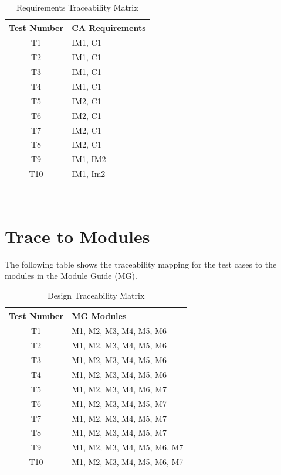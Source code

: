 \documentclass[12pt, titlepage]{article}
\begin{document}
\begin{table} [H]
  \caption{Requirements Traceability Matrix} 
\begin{tabular}{|c|p{4cm}|}
  \hline	
  \textbf{Test Number} & \textbf{CA Requirements}\\
  \hline 
   T1& IM1, C1\\ \hline
   T2& IM1, C1\\ \hline
   T3& IM1, C1\\ \hline
   T4& IM1, C1\\ \hline
   T5& IM2, C1\\ \hline
   T6& IM2, C1\\ \hline
   T7& IM2, C1\\ \hline
   T8& IM2, C1\\ \hline
   T9& IM1, IM2\\ \hline
   T10& IM1, Im2\\ \hline
   

\end{tabular}\\
\end{table}
		
\section{Trace to Modules}\label{sec_tracemodules}
The following table shows the traceability mapping for the test cases  to the
modules in the Module Guide (MG).

\begin{table} [H]
  \caption{Design Traceability Matrix}
  \label{Table:Table_Traceability_MG}  
\begin{tabular}{|c|p{8cm}|}
  \hline	
  \textbf{Test Number} & \textbf{MG Modules}\\
  \hline 
   T1& M1, M2, M3, M4, M5, M6\\ \hline
   T2& M1, M2, M3, M4, M5, M6\\ \hline
   T3& M1, M2, M3, M4, M5, M6\\ \hline
   T4& M1, M2, M3, M4, M5, M6\\ \hline
   T5& M1, M2, M3, M4, M6, M7\\ \hline
   T6& M1, M2, M3, M4, M5, M7\\ \hline
   T7& M1, M2, M3, M4, M5, M7\\ \hline
   T8& M1, M2, M3, M4, M5, M7\\ \hline
   T9& M1, M2, M3, M4, M5, M6, M7\\ \hline
   T10& M1, M2, M3, M4, M5, M6, M7\\ \hline


\end{tabular}\\
\end{table}
		
\end{document}
